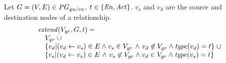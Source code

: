 
%

%


%





\vspace*{10pt}
\begin{definition}[$\extend$]
  \label{def:extend}
  Let $G = (V,E) \in \mathit{PG}_{gu/ea}$, $t \in \{ \mathit{En}, \mathit{Act} \}$. $v_s$ and $v_d$ are the source and destination nodes of a relationship.
\[
\begin{array}{l}
\extend(V_{gr}, G ,t) =  \\
\quad V_{gr} \;\cup \\ 
\quad    \{ v_d | (v_d \leftarrow v_s) \in E \wedge v_s \in V_{gr} \jwb{~\wedge\ v_d \nin V_{gr}} \wedge \type(v_d) = t \} \;\cup \\
\quad   \{ v_s | (v_d \leftarrow v_s) \in E  \jwb{~\wedge\ v_s \nin V_{gr}} \wedge v_d \in V_{gr}  \wedge \jwb{\type(v_s) = t} \}  \\
\end{array}
\]


\end{definition}

